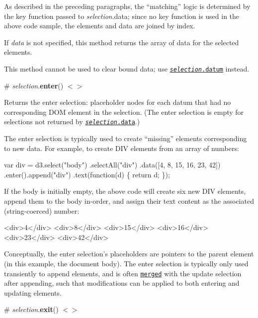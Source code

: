 As described in the preceding paragraphs, the “matching” logic is determined by the key function passed to {\itshape selection}.data; since no key function is used in the above code sample, the elements and data are joined by index.

If {\itshape data} is not specified, this method returns the array of data for the selected elements.

This method cannot be used to clear bound data; use \href{#selection_datum}{\tt {\itshape selection}.datum} instead.

\label{_selection_enter}%
\# {\itshape selection}.{\bfseries enter}() \href{https://github.com/d3/d3-selection/blob/master/src/selection/enter.js}{\tt $<$$>$}

Returns the enter selection\+: placeholder nodes for each datum that had no corresponding D\+OM element in the selection. (The enter selection is empty for selections not returned by \href{#selection_data}{\tt {\itshape selection}.data}.)

The enter selection is typically used to create “missing” elements corresponding to new data. For example, to create D\+IV elements from an array of numbers\+:


\begin{DoxyCode}
var div = d3.select("body")
  .selectAll("div")
  .data([4, 8, 15, 16, 23, 42])
  .enter().append("div")
    .text(function(d) \{ return d; \});
\end{DoxyCode}


If the body is initially empty, the above code will create six new D\+IV elements, append them to the body in-\/order, and assign their text content as the associated (string-\/coerced) number\+:


\begin{DoxyCode}
<div>4</div>
<div>8</div>
<div>15</div>
<div>16</div>
<div>23</div>
<div>42</div>
\end{DoxyCode}


Conceptually, the enter selection’s placeholders are pointers to the parent element (in this example, the document body). The enter selection is typically only used transiently to append elements, and is often \href{#selection_merge}{\tt merged} with the update selection after appending, such that modifications can be applied to both entering and updating elements.

\label{_selection_exit}%
\# {\itshape selection}.{\bfseries exit}() \href{https://github.com/d3/d3-selection/blob/master/src/selection/exit.js}{\tt $<$$>$}

